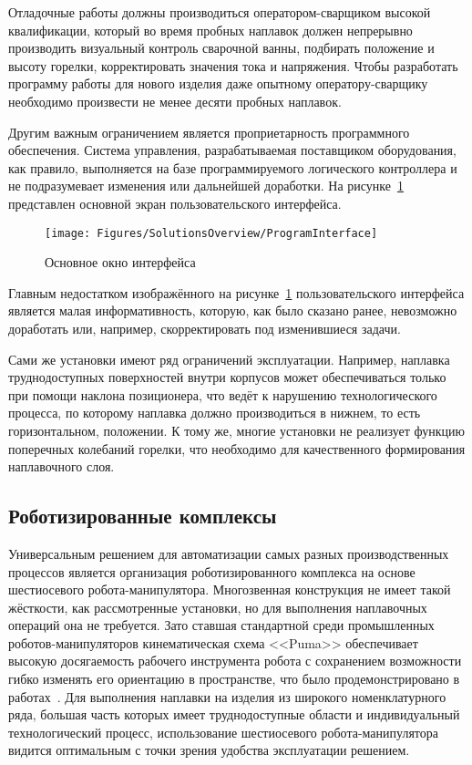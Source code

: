 Отладочные работы должны производиться оператором-сварщиком высокой квалификации, который во время пробных наплавок должен непрерывно производить визуальный контроль сварочной ванны, подбирать положение и высоту горелки, корректировать значения тока и напряжения.
Чтобы разработать программу работы для нового изделия даже опытному оператору-сварщику необходимо произвести не менее десяти пробных наплавок.

Другим важным ограничением является проприетарность программного обеспечения.
Система управления, разрабатываемая поставщиком оборудования, как правило, выполняется на базе программируемого логического контроллера и не подразумевает изменения или дальнейшей доработки.
На рисунке~\ref{fig:Overview:ProgramInterface} представлен основной экран пользовательского интерфейса.

\begin{figure}[H]
    \centering
    \vspace{14pt}
    \texttt{[image: Figures/SolutionsOverview/ProgramInterface]}
    \caption{Основное окно интерфейса}
    \label{fig:Overview:ProgramInterface}
\end{figure}

Главным недостатком изображённого на рисунке~\ref{fig:Overview:ProgramInterface} пользовательского интерфейса является малая информативность, которую, как было сказано ранее, невозможно доработать или, например, скорректировать под изменившиеся задачи.

Сами же установки имеют ряд ограничений эксплуатации.
Например, наплавка труднодоступных поверхностей внутри корпусов может обеспечиваться только при помощи наклона позиционера, что ведёт к нарушению технологического процесса, по которому наплавка должно производиться в нижнем, то есть горизонтальном, положении.
К тому же, многие установки не реализует функцию поперечных колебаний горелки, что необходимо для качественного формирования наплавочного слоя.

\subsection{Роботизированные комплексы}
Универсальным решением для автоматизации самых разных производственных процессов является организация роботизированного комплекса на основе шестиосевого робота-манипулятора.
Многозвенная конструкция не имеет такой жёсткости, как рассмотренные установки, но для выполнения наплавочных операций она не требуется.
Зато ставшая стандартной среди промышленных роботов-манипуляторов кинематическая схема <<Puma>> обеспечивает высокую досягаемость рабочего инструмента робота с сохранением возможности гибко изменять его ориентацию в пространстве, что было продемонстрировано в работах~\cite{Fan_Tien_Cheng_1997, Gupta_1990, Mei_2019}.
Для выполнения наплавки на изделия из широкого номенклатурного ряда, большая часть которых имеет труднодоступные области и индивидуальный технологический процесс, использование шестиосевого робота-манипулятора видится оптимальным с точки зрения удобства эксплуатации решением.

